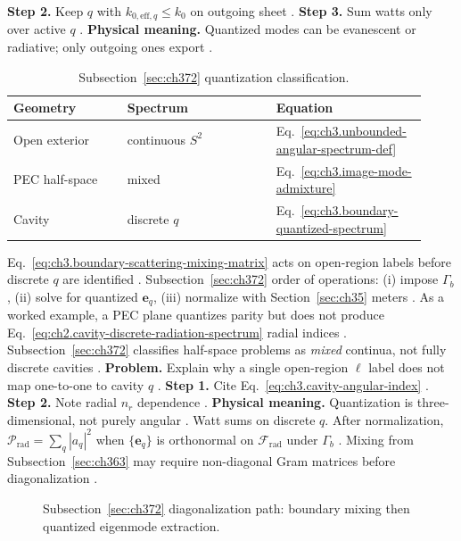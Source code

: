 \textbf{Step 2.} Keep \(q\) with \(k_{0,\mathrm{eff},q}\le k_{0}\) on outgoing sheet \cite{stratton1941}.
\textbf{Step 3.} Sum watts only over active \(q\) \cite{poynting1884}.
\textbf{Physical meaning.} Quantized modes can be evanescent or radiative; only outgoing ones export \cite{harrington2001}.
\begin{table}[t]
\centering
\caption{Subsection~\ref{sec:ch372} quantization classification.}
\label{tab:ch3.372-quantization-taxonomy}
\small
\begin{tabular}{@{}p{0.26\linewidth}p{0.34\linewidth}p{0.32\linewidth}@{}}
\toprule
Geometry & Spectrum & Equation \\
\midrule
Open exterior & continuous \(S^{2}\) & Eq.~\eqref{eq:ch3.unbounded-angular-spectrum-def} \\
PEC half-space & mixed & Eq.~\eqref{eq:ch3.image-mode-admixture} \\
Cavity & discrete \(q\) & Eq.~\eqref{eq:ch3.boundary-quantized-spectrum} \\
\bottomrule
\end{tabular}
\end{table}
Eq.~\eqref{eq:ch3.boundary-scattering-mixing-matrix} acts on open-region labels before discrete \(q\) are identified
\cite{harrington2001}. Subsection~\ref{sec:ch372} order of operations: (i) impose \(\Gamma_{b}\), (ii) solve
for quantized \(\mathbf{e}_{q}\), (iii) normalize with Section~\ref{sec:ch35} meters \cite{hansen1988}.
As a worked example, a PEC plane quantizes parity but does not produce Eq.~\eqref{eq:ch2.cavity-discrete-radiation-spectrum} radial indices
\cite{jackson1999}. Subsection~\ref{sec:ch372} classifies half-space problems as \emph{mixed} continua, not
fully discrete cavities \cite{harrington2001}.
\textbf{Problem.} Explain why a single open-region \(\ell\) label does not map one-to-one to cavity \(q\)
\cite{stratton1941}.
\textbf{Step 1.} Cite Eq.~\eqref{eq:ch3.cavity-angular-index} \cite{jackson1999}.
\textbf{Step 2.} Note radial \(n_{r}\) dependence \cite{stratton1941}.
\textbf{Physical meaning.} Quantization is three-dimensional, not purely angular \cite{harrington2001}.
Watt sums on discrete \(q\). After normalization, \(\mathcal{P}_{\mathrm{rad}}=\sum_{q}|a_{q}|^{2}\) when \(\{\mathbf{e}_{q}\}\) is orthonormal on
\(\mathcal{F}_{\mathrm{rad}}\) under \(\Gamma_{b}\) \cite{poynting1884}. Mixing from
Subsection~\ref{sec:ch363} may require non-diagonal Gram matrices before diagonalization \cite{hansen1988}.
\begin{figure}[t]
\centering
{}
\caption{Subsection~\ref{sec:ch372} diagonalization path: boundary mixing then quantized eigenmode extraction.}
\label{fig:ch3.372-diagonalization}
\end{figure}

